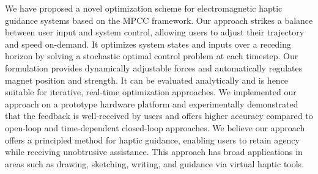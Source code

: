 We have proposed a novel optimization scheme for electromagnetic haptic guidance systems based on the MPCC framework.
Our approach strikes a balance between user input and system control, allowing users to adjust their trajectory and speed on-demand.
It optimizes system states and inputs over a receding horizon by solving a stochastic optimal control problem at each timestep.
Our formulation provides dynamically adjustable forces and automatically regulates magnet position and strength.
It can be evaluated analytically and is hence suitable for iterative, real-time optimization approaches. 
We implemented our approach on a prototype hardware platform and experimentally demonstrated that the feedback is well-received by users and offers higher accuracy compared to open-loop and time-dependent closed-loop approaches.
We believe our approach offers a principled method for haptic guidance, enabling users to retain agency while receiving unobtrusive assistance. This approach has broad applications in areas such as drawing, sketching, writing, and guidance via virtual haptic tools.
%
%
%




